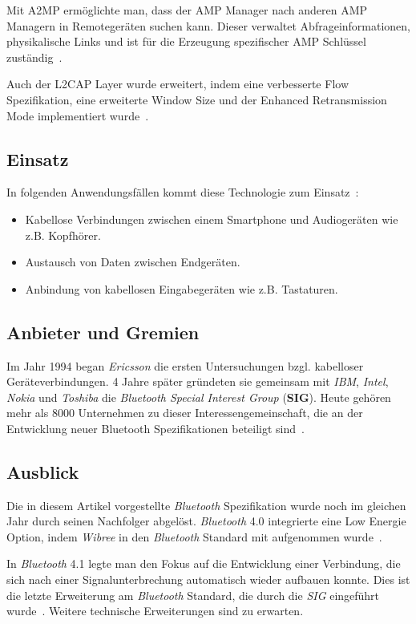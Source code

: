 \begin{multicols}{3}
Mit A2MP ermöglichte man, dass der AMP Manager nach anderen AMP Managern in Remotegeräten suchen kann. Dieser verwaltet Abfrageinformationen, physikalische Links und ist für die Erzeugung spezifischer AMP Schlüssel zuständig~\cite{bluetooth3.0.2}.

Auch der L2CAP Layer wurde erweitert, indem eine verbesserte Flow Spezifikation, eine erweiterte Window Size und der Enhanced Retransmission Mode implementiert wurde~\cite{bluetooth3.0.2}.

\subsection*{Einsatz}
In folgenden Anwendungsfällen kommt diese Technologie zum Einsatz~\cite{bluetooth3.0.1}:
\begin{itemize}
	\item Kabellose Verbindungen zwischen einem Smartphone und Audiogeräten wie z.B. Kopfhörer. 
	\item Austausch von Daten zwischen Endgeräten.
	\item Anbindung von kabellosen Eingabegeräten wie z.B. Tastaturen.
\end{itemize}

\subsection*{Anbieter und Gremien}
Im Jahr 1994 began \textit{Ericsson} die ersten Untersuchungen bzgl. kabelloser Geräteverbindungen. 4 Jahre später gründeten sie gemeinsam mit \textit{IBM}, \textit{Intel}, \textit{Nokia} und \textit{Toshiba} die \textit{Bluetooth Special Interest Group} (\textbf{SIG}). Heute gehören mehr als 8000 Unternehmen zu dieser Interessengemeinschaft, die an der Entwicklung neuer Bluetooth Spezifikationen beteiligt sind~\cite{bluetooth3.0.5}.

\subsection*{Ausblick}
Die in diesem Artikel vorgestellte \textit{Bluetooth} Spezifikation wurde noch im gleichen Jahr durch seinen Nachfolger abgelöst. \textit{Bluetooth} 4.0 integrierte eine Low Energie Option, indem \textit{Wibree} in den \textit{Bluetooth} Standard mit aufgenommen wurde~\cite{bluetooth3.0.1}. 

In \textit{Bluetooth} 4.1 legte man den Fokus auf die Entwicklung einer Verbindung, die sich nach einer Signalunterbrechung automatisch wieder aufbauen konnte. Dies ist die letzte Erweiterung am \textit{Bluetooth} Standard, die durch die \textit{SIG} eingeführt wurde~\cite{bluetooth3.0.1}. Weitere technische Erweiterungen sind zu erwarten. 

\printbibliography[segment=2,heading=subbibliography]
\end{multicols}

\newpage
